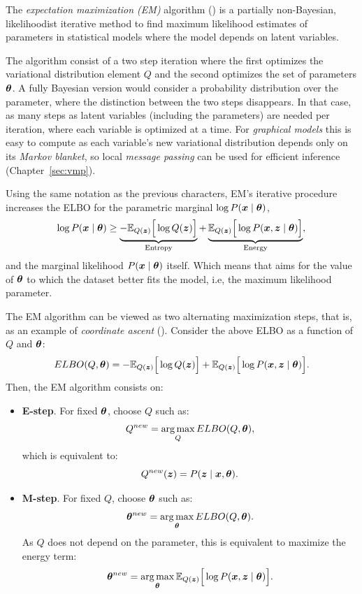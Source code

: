 
The \emph{expectation maximization (EM)} algorithm (\cite{mclachlan2007algorithm, bishop2006pattern}) is a partially non-Bayesian, likelihoodist iterative method to find maximum likelihood estimates of parameters in statistical models where the model depends on latent variables.

The algorithm consist of a two step iteration where the first optimizes the variational distribution element \(Q\)  and the second optimizes the set of parameters \(\bm{\theta}\). A fully Bayesian version would consider a probability distribution over the parameter, where the distinction between the two steps disappears. In that case, as many steps as latent variables (including the parameters) are needed per iteration, where each variable is optimized at a time. For \emph{graphical models} this is easy to compute as each variable's new variational distribution depends only on its \emph{Markov blanket}, so local \emph{message passing} can be used for efficient inference (Chapter~\ref{sec:vmp}).

Using the same notation as the previous characters, EM's iterative procedure increases the ELBO for the parametric marginal \(\log P(\bm{x} \mid \bm{\theta})\),
\[
  \log{P(\bm{x}\mid \bm{\theta})} \geq \underbrace{-\mathbb{E}_{Q(\bm{z})}\Big[\log{Q(\bm{z})}\Big]}_{\text{Entropy}} + \underbrace{\mathbb{E}_{Q(\bm{z})}\Big[\log{P(\bm{x}, \bm{z}\mid \bm{\theta})}\Big]}_{\text{Energy}},
\]
and the marginal likelihood \(P(\bm{x} \mid \bm{\theta})\) itself. Which means that aims for the value of \(\bm{\theta}\) to which the dataset better fits the model, i.e, the maximum likelihood parameter.


The EM algorithm can be viewed as two alternating maximization steps, that is, as an example of \emph{coordinate ascent} (\cite{neal1998view}). Consider the above ELBO as a function of \(Q\) and \(\bm{\theta}\):
\[
  ELBO(Q, \bm{\theta}) = -\mathbb{E}_{Q(\bm{z})}\Big[\log{Q(\bm{z})}\Big] + \mathbb{E}_{Q(\bm{z})}\Big[\log{P(\bm{x}, \bm{z}\mid \bm{\theta})}\Big].
\]
Then, the EM algorithm consists on:
\begin{itemize}
  \item \textbf{E-step}. For fixed \(\bm{\theta}\), choose \(Q\) such as:
    \[
    Q^{new} = \operatorname*{arg\,max}_{Q}ELBO(Q, \bm{\theta}),
    \]
    which is equivalent to:
    \[
    Q^{new}(\bm{z}) = P(\bm{z} \mid \bm{x} , \bm{\theta}).
    \]
  \item \textbf{M-step}. For fixed \(Q\), choose \(\bm{\theta}\) such as:
    \[
    \bm{\theta}^{new} = \operatorname*{arg\,max}_{\bm{\theta}}ELBO(Q, \bm{\theta}).
    \]
    As \(Q\) does not depend on the parameter, this is equivalent to maximize the energy term:
    \[
    \bm{\theta}^{new} = \operatorname*{arg\,max}_{\bm{\theta}} \mathbb{E}_{Q(\bm{z})}\Big[\log{P(\bm{x}, \bm{z}\mid \bm{\theta})}\Big].
    \]
\end{itemize}

